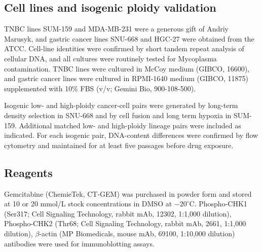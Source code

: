\documentclass[11pt,notitlepage]{article}
\begin{document}







\subsection{Cell lines and isogenic ploidy validation}
  \label{sec:methods-cell-lines-ploidy-validation}

TNBC lines SUM-159 and MDA-MB-231 were a generous gift of Andriy Marusyk, and gastric cancer lines SNU-668 and HGC-27 were obtained from the ATCC. Cell-line identities were confirmed by
  short tandem repeat analysis of cellular DNA, and all cultures were routinely tested for Mycoplasma contamination. TNBC lines were cultured in McCoy medium (GIBCO, 16600), and gastric
  cancer lines were cultured in RPMI-1640 medium (GIBCO, 11875) supplemented with 10\% FBS (v/v; Gemini Bio, 900-108-500).

  Isogenic low- and high-ploidy cancer-cell pairs were generated by long-term density selection in SNU-668 \cite{veith_cloneid_2025} and by cell fusion \cite{su_somatic_2015} and long term hypoxia \cite{XX} in SUM-159.
  Additional matched low- and high-ploidy lineage pairs were included as indicated. For each isogenic pair, DNA-content differences were confirmed by flow cytometry and maintained for at
  least five passages before drug exposure.
  
\subsection{Reagents}
Gemcitabine (ChemieTek, CT-GEM) was purchased in powder form and stored at 10 or 20 mmol/L stock concentrations in DMSO at $-20^\circ$C. Phospho-CHK1 (Ser317; Cell Signaling Technology, rabbit mAb, 12302, 1:1,000 dilution), Phospho-CHK2 (Thr68; Cell Signaling Technology, rabbit mAb, 2661, 1:1,000 dilution), $\beta$-actin (MP Biomedicals, mouse mAb, 69100, 1:10,000 dilution) antibodies were used for immunoblotting assays. 
\end{document}
